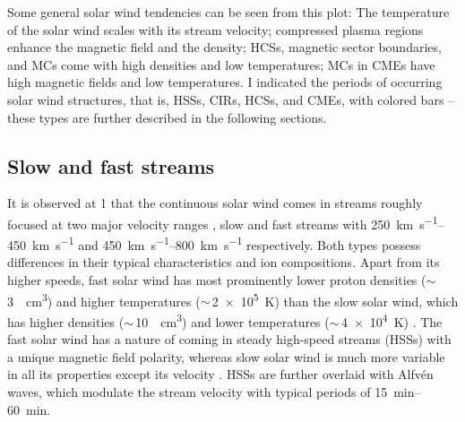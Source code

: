 Some general solar wind tendencies can be seen from this plot: The temperature of the solar wind scales with its stream velocity; compressed plasma regions enhance the magnetic field and the density; HCSs, magnetic sector boundaries, and MCs come with high densities and low temperatures; MCs in CMEs have high magnetic fields and low temperatures. I indicated the periods of occurring solar wind structures, that is, HSSs, CIRs, HCSs, and CMEs, with colored bars -- these types are further described in the following sections.


\subsection{Slow and fast streams}
\label{sec:slow_and_fast_streams}
It is observed at \SI{1}{\au} that the continuous solar wind comes in streams roughly focused at two major velocity ranges \citep{Neugebauer1966,Schwenn1983}, slow and fast streams with \SIrange{250}{450}{\km\per\s} and \SIrange{450}{800}{\km\per\s} respectively. Both types possess differences in their typical characteristics and ion compositions. Apart from its higher speeds, fast solar wind has most prominently lower proton densities ($\sim$\,\SI{3}{\per\cm\cubed}) and higher temperatures ($\sim$\,\SI{2e5}{\K}) than the slow solar wind, which has higher densities ($\sim$\,\SI{10}{\per\cm\cubed}) and lower temperatures ($\sim$\,\SI{4e4}{\K}) \citep{Schwenn1990}. The fast solar wind has a nature of coming in steady high-speed streams (HSSs) with a unique magnetic field polarity, whereas slow solar wind is much more variable in all its properties except its velocity \citep{Bame1977}. HSSs are further overlaid with Alfvén waves, which modulate the stream velocity with typical periods of \SIrange{15}{60}{\minute}.

